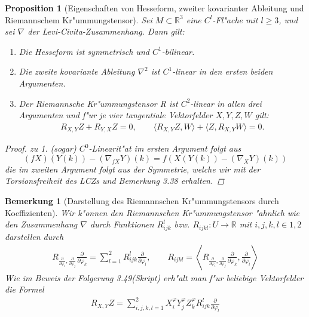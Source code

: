 \documentclass[10pt,a4paper]{article}
\newcommand{\fc}[1]{\special{fc=#1}}
\newtheorem{bem}[sat]{Bemerkung}
\newtheorem{prop}[sat]{Proposition}
\begin{document}
\fc{PEHesseformusw}
\begin{prop}[Eigenschaften von Hesseform, zweiter kovarianter Ableitung und Riemannschem Kr"ummungstensor]
Sei $M\subset \mathbb{R}^3$ eine $C^l$-Fl"ache mit $l\geq 3$, und sei $\nabla$ der Levi-Civita-Zusammenhang.
Dann gilt:
\begin{enumerate}
 \item Die Hesseform ist symmetrisch und $C^1$-bilinear.
 \item Die zweite kovariante Ableitung $\nabla^2$ ist $C^1$-linear in den ersten beiden Argumenten.
 \item Der Riemannsche Kr"ummungstensor R ist $C^2$-linear in allen drei Argumenten und f"ur je vier 
 tangentiale Vektorfelder $X,Y,Z,W$ gilt:
 \begin{equation*}\begin{aligned}
  R_{X,Y}Z + R_{Y,X}Z = 0,\qquad \langle R_{X,Y}Z, W \rangle + \langle Z, R_{X,Y}W \rangle = 0.
 \end{aligned}\end{equation*}

\end{enumerate}
\begin{proof}
zu 1. (sogar) $C^0$-Linearit"at im ersten Argument folgt aus 
\[(fX)(Y(k))-(\nabla_{fX}Y)(k)=f(X(Y(k))-(\nabla_XY)(k))\]
die im zweiten Argument folgt aus der Symmetrie, welche wir mit der Torsionsfreiheit des LCZs und Bemerkung 3.38 erhalten.
\end{proof}


\end{prop}

\fc{BadesKrTe}
\begin{bem}[Darstellung des Riemannschen Kr"ummungstensors durch Koeffizienten]
 Wir k"onnen den Riemannschen Kr"ummungstensor "ahnlich wie den Zusammenhang $\nabla$ durch Funktionen
 $R^l_{ijk}$ bzw. $R_{ijkl}: U\rightarrow \mathbb{R}$ mit $i,j,k,l\in {1,2}$ darstellen durch
 \begin{align*}
  R_{\frac{\partial}{\partial{\varphi_i}}, \frac{\partial}{\partial{\varphi_j}}}\frac{\partial}{\partial{\varphi_k}}
  = \sum\limits_{l=1}^2 R^l_{ijk}\frac{\partial}{\partial{\varphi_l}},\qquad 
  R_{ijkl} = \left\langle R_{\frac{\partial}{\partial{\varphi_i}}, \frac{\partial}{\partial{\varphi_j}}}\frac{\partial}{\partial{\varphi_k}}, \frac{\partial}{\partial{\varphi_l}} \right\rangle
 \end{align*}
Wie im Beweis der Folgerung 3.49(Skript) erh"alt man f"ur beliebige Vektorfelder die Formel
\begin{align*}
 R_{X,Y}Z = \sum\limits_{i,j,k,l=1}^2 X^\varphi_i Y^\varphi_j Z^\varphi_k R^l_{ijk} \frac{\partial}{\partial{\varphi_l}}
\end{align*}
\end{bem}
\end{document}
